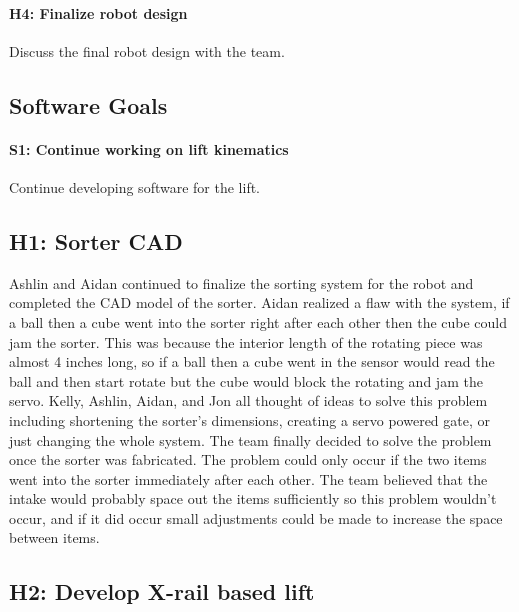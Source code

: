\documentclass{article}
\begin{document}
\paragraph{H4: Finalize robot design}
 Discuss the final robot design with the team.
\subsection{Software Goals}
\paragraph{S1: Continue working on lift kinematics}
 Continue developing software for the lift.
\newpage
\subsection{H1: Sorter CAD}

Ashlin and Aidan continued to finalize the sorting system for the robot and completed the CAD model of the sorter. Aidan realized a flaw with the system, if a ball then a cube went into the sorter right after each other then the cube could jam the sorter. This was because the interior length of the rotating piece was almost 4 inches long, so if a ball then a cube went in the sensor would read the ball and then start rotate but the cube would block the rotating and jam the servo. Kelly, Ashlin, Aidan, and Jon all thought of ideas to solve this problem including shortening the sorter's dimensions, creating a servo powered gate, or just changing the whole system. The team finally decided to solve the problem once the sorter was fabricated. The problem could only occur if the two items went into the sorter immediately after each other. The team believed that the intake would probably space out the items sufficiently so this problem wouldn't occur, and if it did occur small adjustments could be made to increase the space between items.

\subsection{H2: Develop X-rail based lift}
\end{document}
